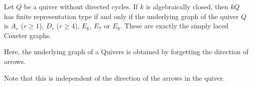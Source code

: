 Let $Q$ be a quiver without directed cycles. If $k$ is algebraically closed,
then $kQ$ has finite representation type if and only if the underlying graph
of the quiver $Q$ is $A_r$ ($r\geq 1$), $D_r$ ($r\geq 4$), $E_6$, $E_7$ or $E_8$.
These are exactly the simply laced Coxeter graphs.

Here, the underlying graph of a Quivers is obtained by forgetting the direction
of arrows.

Note that this is independent of the direction of the arrows in the quiver.
